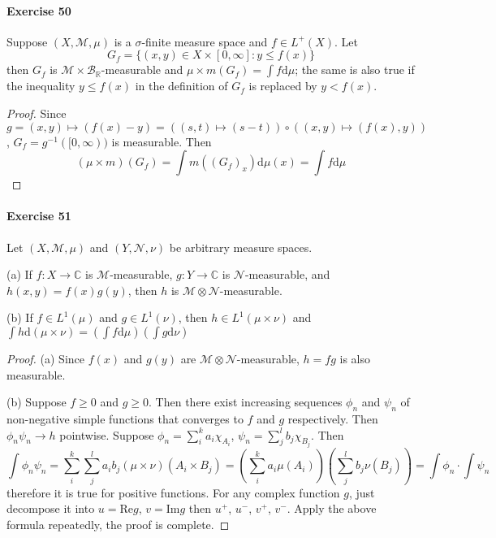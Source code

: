 \paragraph{Exercise 50}
Suppose $(X,\mathcal{M},\mu)$ is a $\sigma$-finite measure space and $f\in L^+(X)$. Let 
$$
G_f=\{(x,y)\in X\times[0,\infty]:y\le f(x)\}
$$
then $G_f$ is $\mathcal{M}\times\mathcal{B}_{\mathbb{R}}$-measurable and $\mu\times m(G_f)=\int f\mathrm{d}\mu$; the same is also true if the inequality $y\le f(x)$ in the definition of $G_f$ is replaced by $y<f(x)$.
\begin{proof}
    Since $g=(x,y)\mapsto(f(x)-y)=((s,t)\mapsto (s-t))\circ((x,y)\mapsto(f(x),y))$, $G_f=g^{-1}([0,\infty))$ is measurable. Then
    $$
    (\mu\times m)(G_f)=\int m((G_f)_x)\mathrm{d}\mu(x)=\int f\mathrm{d}\mu
    $$
\end{proof}
\paragraph{Exercise 51}
Let $(X,\mathcal{M},\mu)$ and $(Y,\mathcal{N},\nu)$ be arbitrary measure spaces.
\par (a) If $f:X\to\mathbb{C}$ is $\mathcal{M}$-measurable, $g:Y\to\mathbb{C}$ is $\mathcal{N}$-measurable, and $h(x,y)=f(x)g(y)$, then $h$ is $\mathcal{M}\otimes\mathcal{N}$-measurable.
\par (b) If $f\in L^1(\mu)$ and $g\in L^1(\nu)$, then $h\in L^1(\mu\times\nu)$ and $\int h\mathrm{d}(\mu\times\nu)=(\int f\mathrm{d}\mu)(\int g\mathrm{d}\nu)$
\begin{proof}
    \par (a) Since $f(x)$ and $g(y)$ are $\mathcal{M}\otimes\mathcal{N}$-measurable, $h=fg$ is also measurable.
    \par (b) Suppose $f\ge 0$ and $g\ge 0$. Then there exist increasing sequences $\phi_n$ and $\psi_n$ of non-negative simple functions that converges to $f$ and $g$ respectively. Then $\phi_n\psi_n\to h$ pointwise. Suppose $\phi_n=\sum^k_ia_i\chi_{A_i}$, $\psi_n=\sum^l_jb_j\chi_{B_j}$. Then
    $$
    \int\phi_n\psi_n=\sum^k_i\sum^l_ja_ib_j(\mu\times\nu)(A_i\times B_j)=\left(\sum^k_ia_i\mu(A_i)\right)\left(\sum^l_jb_j\nu(B_j)\right)=\int\phi_n\cdot\int\psi_n
    $$
    therefore it is true for positive functions. For any complex function $g$, just decompose it into $u=\mathrm{Re}g$, $v=\mathrm{Im}g$ then $u^+$, $u^-$, $v^+$, $v^-$. Apply the above formula repeatedly, the proof is complete.
\end{proof}
